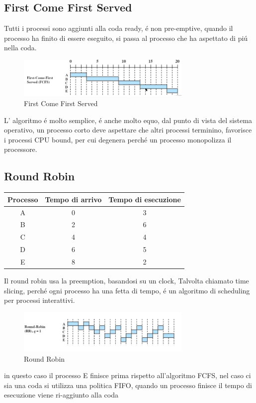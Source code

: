     \subsection{First Come First Served}
    Tutti i processi sono aggiunti alla coda ready, é non pre-emptive, quando il processo ha finito di essere eseguito, si passa
    al processo che ha aspettato di piú nella coda.
    \begin{figure}[H]
        \centering
        \includegraphics[width=0.75\textwidth]{immagini/FCFS}
        \caption{First Come First Served}
    \end{figure}
    L' algoritmo é molto semplice, é anche molto equo, dal punto di vista del sistema operativo, un processo corto
    deve aspettare che altri processi terminino, favorisce i processi CPU bound, per cui degenera perché un processo 
    monopolizza il processore.
    \subsection{Round Robin}
        \begin{table}[H]
        \raggedright
        \begin{tabular}{|c|c|c|}
            \hline
            \textbf{Processo} & \textbf{Tempo di arrivo} & \textbf{Tempo di esecuzione} \\
            \hline
            A & 0 & 3   \\
            \hline
            B & 2 & 6 \\
            \hline
            C & 4 & 4  \\
            \hline
            D & 6 & 5  \\
            \hline
            E & 8 & 2  \\
            \hline
        \end{tabular}
    \end{table}
    Il round robin usa la preemption, basandosi su un clock, Talvolta chiamato time slicing, perché ogni processo
    ha una fetta di tempo, é un algoritmo di scheduling per processi interattivi.
    \begin{figure}[H]
        \centering
        \includegraphics[width=0.75\textwidth]{immagini/RoundRobin}
        \caption{Round Robin}
    \end{figure}
    in questo caso il processo E finisce prima rispetto all'algoritmo FCFS, nel
    caso ci sia una coda si utilizza una politica FIFO, quando un processo finisce il tempo di esecuzione viene ri-aggiunto alla coda


